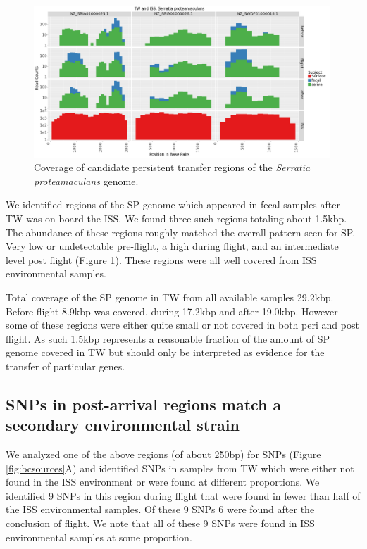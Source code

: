 \begin{figure}
  \begin{center}
    \includegraphics[width=0.99\textwidth]{figs/sprota_read_recruit.png}
	\caption{\small{
	    Coverage of candidate persistent transfer regions of the \textit{Serratia proteamaculans} genome.
	}}
    \label{fig:sprota}
  \end{center}
\end{figure}

We identified regions of the SP genome which appeared in fecal samples after TW was on board the ISS. We found three such regions totaling about 1.5kbp. The abundance of these regions roughly matched the overall pattern seen for SP. Very low or undetectable pre-flight, a high during flight, and an intermediate level post flight (Figure \ref{fig:sprota}). These regions were all well covered from ISS environmental samples.

Total coverage of the SP genome in TW from all available samples 29.2kbp. Before flight 8.9kbp was covered, during 17.2kbp and after 19.0kbp. However some of these regions were either quite small or not covered in both peri and post flight. As such 1.5kbp represents a reasonable fraction of the amount of SP genome covered in TW but should only be interpreted as evidence for the transfer of particular genes. 


\subsection{SNPs in post-arrival regions match a secondary environmental strain}

We analyzed one of the above regions (of about 250bp) for SNPs (Figure \ref{fig:bcsources}A) and identified SNPs in samples from TW which were either not found in the ISS environment or were found at different proportions. We identified 9 SNPs in this region during flight that were found in fewer than half of the ISS environmental samples. Of these 9 SNPs 6 were found after the conclusion of flight. We note that all of these 9 SNPs were found in ISS environmental samples at some proportion.

